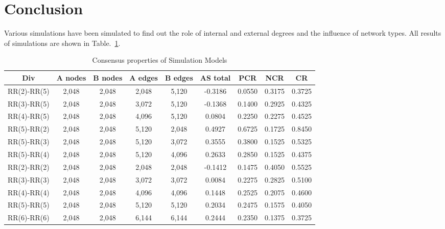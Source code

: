 \section{Conclusion}
Various simulations have been simulated to find out the role of internal and external degrees and the influence of network types. All results of simulations are shown in Table.~\ref{Consensus properties of Simulation Models}. 
\begin{table}[!htb]
	\scriptsize
	\centering
    \caption{Consensus properties of Simulation Models}
	\label{Consensus properties of Simulation Models}
	\begin{center}
		\begin{tabular}{c|c|c|c|c|c|c|c|c} \hline\hline
			Div                    & A nodes& B nodes & A edges & B edges & AS total  & PCR    & NCR    & CR       \\ \hline \hline
			RR(2)-RR(5)            & 2,048  & 2,048   & 2,048   & 5,120   & -0.3186   & 0.0550 & 0.3175 & 0.3725   \\ \hline
			RR(3)-RR(5)            & 2,048  & 2,048   & 3,072   & 5,120   & -0.1368   & 0.1400 & 0.2925 & 0.4325   \\ \hline
			RR(4)-RR(5)            & 2,048  & 2,048   & 4,096   & 5,120   &  0.0804   & 0.2250 & 0.2275 & 0.4525   \\ \hline
			RR(5)-RR(2)            & 2,048 	& 2,048   & 5,120   & 2,048   &  0.4927   & 0.6725 & 0.1725 & 0.8450   \\ \hline	
			RR(5)-RR(3)            & 2,048 	& 2,048   & 5,120   & 3,072   &  0.3555   & 0.3800 & 0.1525 & 0.5325   \\ \hline
			RR(5)-RR(4)            & 2,048  & 2,048   & 5,120   & 4,096   &  0.2633   & 0.2850 & 0.1525 & 0.4375   \\ \hline
			RR(2)-RR(2)            & 2,048  & 2,048   & 2,048   & 2,048   & -0.1412   & 0.1475 & 0.4050 & 0.5525   \\ \hline
			RR(3)-RR(3)            & 2,048  & 2,048   & 3,072   & 3,072   &  0.0084   & 0.2275 & 0.2825 & 0.5100   \\ \hline
			RR(4)-RR(4)            & 2,048  & 2,048   & 4,096   & 4,096   &  0.1448   & 0.2525 & 0.2075 & 0.4600   \\ \hline
			RR(5)-RR(5)            & 2,048  & 2,048   & 5,120   & 5,120   &  0.2034   & 0.2475 & 0.1575 & 0.4050   \\ \hline
			RR(6)-RR(6)            & 2,048  & 2,048   & 6,144   & 6,144   &  0.2444   & 0.2350 & 0.1375 & 0.3725   \\ \hline

\end{tabular}
\end{center}
\end{table}
